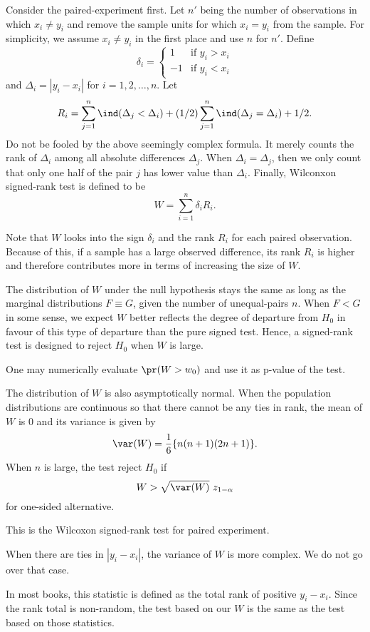 Consider the paired-experiment first.
Let $n'$ being the number of observations in which
$x_i \neq y_i$ and remove the sample units
for which $x_i = y_i$ from the sample. For simplicity, we 
assume $x_i \neq y_i$ in the first place and use $n$ for $n'$.
Define
\[
\delta_i = \left \{
\begin{array}{rl}
1 & \mbox{if  } { y_i > x_i}\\
-1 & \mbox{if  } { y_i < x_i}
\end{array}
\right .
\]
and $\Delta_i = | y_i - x_i|$ for $i=1, 2, \ldots, n$.
Let
\[
R_i = \sum_{j=1}^{n} \ind ( \Delta_j < \Delta_i) 
+  (1/2) \sum_{j=1}^{n} \ind ( \Delta_j = \Delta_i) + 1/2.
\]
Do not be fooled by the above seemingly complex formula.
It merely counts the rank of $\Delta_i$ among all absolute
differences $\Delta_j$. When $\Delta_i = \Delta_j$, then
we only count that only one half of the pair $j$ has lower
value than $\Delta_i$.
Finally, Wilconxon signed-rank test is defined to be
\[
W = \sum_{i=1}^n \delta_i R_i.
\]

Note that $W$ looks into the sign $\delta_i$ and the rank $R_i$ for each
paired observation.
Because of this, if a sample has a large observed difference,
its rank $R_i$ is higher and therefore contributes more
in terms of increasing the size of $W$.

The distribution of $W$ under the null hypothesis
stays the same as long as the marginal distributions
$F \equiv G$, given the number of unequal-pairs $n$.
When $ F < G$ in some sense, we expect $W$
better reflects
the degree of departure from $H_0$ in favour of this
type of departure than the pure signed test. 
Hence, a signed-rank test is designed to reject $H_0$ when $W$ is large.

One may numerically evaluate $\pr (W > w_0)$ and use it
as p-value of the test.

The distribution of $W$ is also asymptotically normal.
When the population distributions are continuous so that
there cannot be any ties in rank, the mean of $W$ is $0$ 
and its variance is given by
\[
\var (W) = \frac{1}{6} \{ n (n+1) (2n+1)\}.
\]
When $n$ is large, the test reject $H_0$
if
\[
W > \sqrt{\var (W)}\ z_{1-\alpha}
\]
for one-sided alternative.

This is the Wilcoxon signed-rank test for paired experiment.

When there are ties in $|y_i - x_i|$, the variance of $W$ is more complex.
We do not go over that case.

In most books, this statistic is defined as the total rank of positive
$y_i - x_i$. Since the rank total is non-random, the test based on our $W$
is the same as the test based on those statistics.

